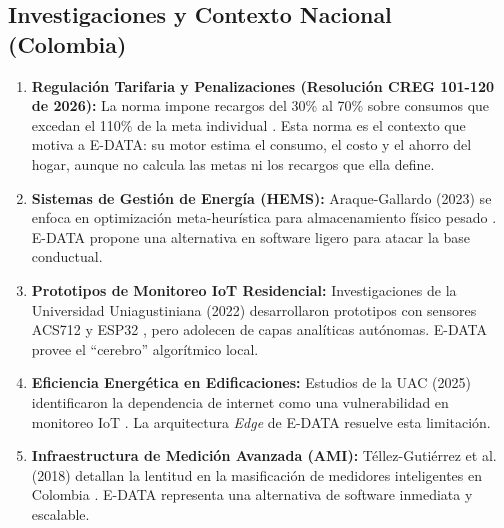 \documentclass[10pt,journal,compsoc]{IEEEtran}
\begin{document}
\subsection{Investigaciones y Contexto Nacional (Colombia)}
\begin{enumerate}
\item \textbf{Regulación Tarifaria y Penalizaciones (Resolución CREG 101-120 de 2026):} La norma impone recargos del 30\% al 70\% sobre consumos que excedan el 110\% de la meta individual \cite{creg2026}. Esta norma es el contexto que motiva a E-DATA: su motor estima el consumo, el costo y el ahorro del hogar, aunque no calcula las metas ni los recargos que ella define.
\item \textbf{Sistemas de Gestión de Energía (HEMS):} Araque-Gallardo (2023) se enfoca en optimización meta-heurística para almacenamiento físico pesado \cite{araque2023}. E-DATA propone una alternativa en software ligero para atacar la base conductual.
\item \textbf{Prototipos de Monitoreo IoT Residencial:} Investigaciones de la Universidad Uniagustiniana (2022) desarrollaron prototipos con sensores ACS712 y ESP32 \cite{uniagustiniana2022}, pero adolecen de capas analíticas autónomas. E-DATA provee el ``cerebro'' algorítmico local.
\item \textbf{Eficiencia Energética en Edificaciones:} Estudios de la UAC (2025) identificaron la dependencia de internet como una vulnerabilidad en monitoreo IoT \cite{uac2025}. La arquitectura \emph{Edge} de E-DATA resuelve esta limitación.
\item \textbf{Infraestructura de Medición Avanzada (AMI):} Téllez-Gutiérrez et al. (2018) detallan la lentitud en la masificación de medidores inteligentes en Colombia \cite{tellez2018}. E-DATA representa una alternativa de software inmediata y escalable.
\end{enumerate}

\end{document}
